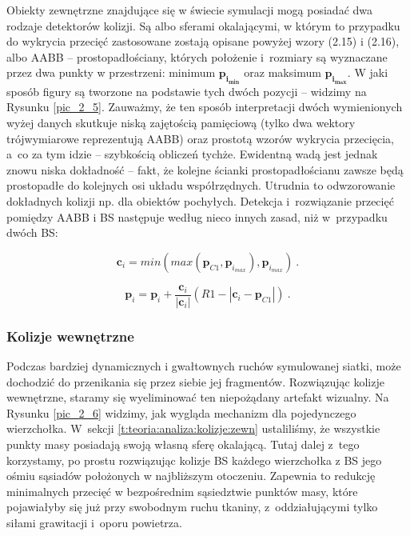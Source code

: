 				
				Obiekty zewnętrzne znajdujące się w świecie symulacji mogą posiadać dwa rodzaje detektorów kolizji. Są albo sferami okalającymi, w którym to przypadku do wykrycia przecięć zastosowane zostają opisane powyżej wzory (2.15) i (2.16), albo AABB -- prostopadłościany, których położenie i~rozmiary są wyznaczane przez dwa punkty w przestrzeni: minimum \(\mathbf{p_{i_{min}}}\) oraz maksimum \(\mathbf{p_{i_{max}}}\). W jaki sposób figury są tworzone na podstawie tych dwóch pozycji -- widzimy na Rysunku \ref{pic_2_5}. Zauważmy, że ten sposób interpretacji dwóch wymienionych wyżej danych skutkuje niską zajętością pamięciową (tylko dwa wektory trójwymiarowe reprezentują AABB) oraz prostotą wzorów wykrycia przecięcia, a~co za tym idzie -- szybkością obliczeń tychże. Ewidentną wadą jest jednak znowu niska dokładność -- fakt, że kolejne ścianki prostopadłościanu zawsze będą prostopadłe do kolejnych osi układu współrzędnych. Utrudnia to odwzorowanie dokładnych kolizji np. dla obiektów pochyłych. Detekcja i~rozwiązanie przecięć pomiędzy AABB i BS następuje według nieco innych zasad, niż w~przypadku dwóch BS:
				
				\begin{equation}
				\mathbf{c}_{i} =  min(max(\mathbf{p}_{C1}, \mathbf{p}_{i_{max}}), \mathbf{p}_{i_{max}})  \ .
				\end{equation}
				
				\begin{equation}
				\mathbf{p}_{i} = \mathbf{p}_{i} + \frac{\mathbf{c}_{i}}{|\mathbf{c}_{i}|}(R1 - |\mathbf{c}_{i} - \mathbf{p}_{C1}|) \ .
				\end{equation}
			
			\subsubsection{Kolizje wewnętrzne}
			\label{t:teoria:analiza:kolizje:wewn}
			
				
				Podczas bardziej dynamicznych i gwałtownych ruchów symulowanej siatki, może dochodzić do przenikania się przez siebie jej fragmentów. Rozwiązując kolizje wewnętrzne, staramy się wyeliminować ten niepożądany artefakt wizualny. Na Rysunku \ref{pic_2_6} widzimy, jak wygląda mechanizm dla pojedynczego wierzchołka. W~sekcji \ref{t:teoria:analiza:kolizje:zewn} ustaliliśmy, że wszystkie punkty masy posiadają swoją własną sferę okalającą. Tutaj dalej z~tego korzystamy, po prostu rozwiązując kolizje BS każdego wierzchołka z BS jego ośmiu sąsiadów położonych w najbliższym otoczeniu. Zapewnia to redukcję minimalnych przecięć w bezpośrednim sąsiedztwie punktów masy, które pojawiałyby się już przy swobodnym ruchu tkaniny, z~oddziałującymi tylko siłami grawitacji i~oporu powietrza.
				
